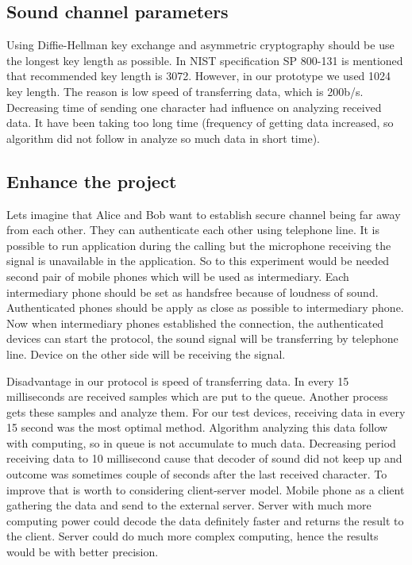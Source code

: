\documentclass[11pt,titlepage]{article}
\theoremstyle{plain}
\begin{document}
\subsection{Sound channel parameters}

Using Diffie-Hellman key exchange and asymmetric cryptography should be use the longest key length as possible. In NIST specification SP 800-131 is mentioned that recommended key length is 3072. However, in our prototype we used 1024 key length. The reason is low speed of transferring data, which is 200b/s. Decreasing time of sending one character had influence on analyzing received data. It have been taking too long time (frequency of getting data increased, so algorithm did not follow in analyze so much data in short time).

\vspace{5mm}


\subsection{Enhance the project}
Lets imagine that Alice and Bob want to establish secure channel being far away from each other. They can authenticate each other using telephone line. It is possible to run application during the calling but the microphone receiving the signal is unavailable in the application. So to this experiment would be needed second pair of mobile phones which will be used as intermediary. Each intermediary phone should be set as handsfree because of loudness of sound. Authenticated phones should be apply as close as possible to intermediary phone. Now when intermediary phones established the connection, the authenticated devices can start the protocol, the sound signal will be transferring by telephone line. Device on the other side will be receiving the signal. 

\vspace{5mm}

Disadvantage in our protocol is speed of transferring data. In every 15 milliseconds are received samples which are put to the queue. Another process gets these samples and analyze them. For our test devices, receiving data in every 15 second was the most optimal method. Algorithm analyzing this data follow with computing, so in queue is not accumulate to much data. Decreasing period receiving data to 10 millisecond cause that decoder of sound did not keep up and outcome was sometimes couple of seconds after the last received character. To improve that is worth to considering client-server model. Mobile phone as a client gathering the data and send to the external server. Server with much more computing power could decode the data definitely faster and returns the result to the client. Server could do much more complex computing, hence the results would be with better precision.
\end{document}
